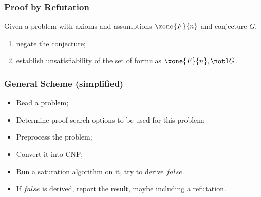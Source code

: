 
                         \begin{frame}
                     \frametitle{Proof by Refutation}

Given a problem with axioms and assumptions $\xone{F}{n}$ and 
conjecture $G$,

\begin{enumerate}
\item negate the conjecture;
\item establish \alert{unsatisfiability} of the set of formulas
$\xone{F}{n},\notl G$.
\end{enumerate}

\bigskip


\bigskip



                                \end{frame}


                            \begin{frame}
                              \frametitle{General Scheme (simplified)}

\begin{itemize}
\item \alert<1>{Read a problem};
\item Determine \alert<1>{proof-search options} to be used for this problem;
\item \alert<1>{Preprocess the problem};
\item \alert<1>{Convert it into CNF};
\item {Run a \alert{saturation algorithm} on it, try to derive $false$.}
\item If $false$ is derived, report the \alert<1>{result}, maybe including
  a refutation. 
\end{itemize}


                                \end{frame}

